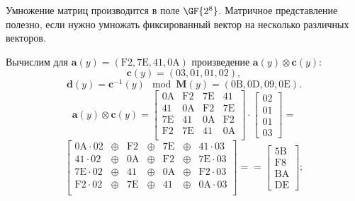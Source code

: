 Умножение матриц производится в поле $\GF{2^8}$. Матричное представление полезно, если нужно умножать фиксированный вектор на несколько различных векторов.

Вычислим для $\mathbf{a}(y) = (\mathrm{F2}, \mathrm{7E}, \mathrm{41}, \mathrm{0A})$ произведение $\mathbf{a}(y) \otimes \mathbf{c}(y)$:
\[
    \mathbf{c}(y) = (03, 01, 01, 02),
\] \[
    \mathbf{d}(y) = \mathbf{c}^{-1}(y) \mod \mathbf{M}(y) = (\mathrm{0B}, \mathrm{0D}, \mathrm{09}, \mathrm{0E}).
\] \[
    \mathbf{a}(y) \otimes \mathbf{c}(y) =
    \left[ \begin{array}{cccc}
        \mathrm{0A} & \mathrm{F2} & \mathrm{7E} & \mathrm{41} \\
        \mathrm{41} & \mathrm{0A} & \mathrm{F2} & \mathrm{7E} \\
        \mathrm{7E} & \mathrm{41} & \mathrm{0A} & \mathrm{F2} \\
        \mathrm{F2} & \mathrm{7E} & \mathrm{41} & \mathrm{0A} \\
    \end{array} \right] \cdot
    \left[ \begin{array}{c} \mathrm{02} \\ \mathrm{01} \\ \mathrm{01} \\ \mathrm{03} \end{array} \right] =
\] \[
    \left[ \begin{array}{ccccccc}
        \mathrm{0A} \cdot \mathrm{02} & \oplus & \mathrm{F2} & \oplus & \mathrm{7E} & \oplus & \mathrm{41} \cdot \mathrm{03} \\
        \mathrm{41} \cdot \mathrm{02} & \oplus & \mathrm{0A} & \oplus & \mathrm{F2} & \oplus & \mathrm{7E} \cdot \mathrm{03} \\
        \mathrm{7E} \cdot \mathrm{02} & \oplus & \mathrm{41} & \oplus & \mathrm{0A} & \oplus & \mathrm{F2} \cdot \mathrm{03} \\
        \mathrm{F2} \cdot \mathrm{02} & \oplus & \mathrm{7E} & \oplus & \mathrm{41} & \oplus & \mathrm{0A} \cdot \mathrm{03} \\
    \end{array} \right] =
    =\left[ \begin{array}{c} \mathrm{5B} \\ \mathrm{F8} \\ \mathrm{BA} \\ \mathrm{DE} \end{array} \right];
\] \[
    \begin{array}{l}

\end{array}\]
